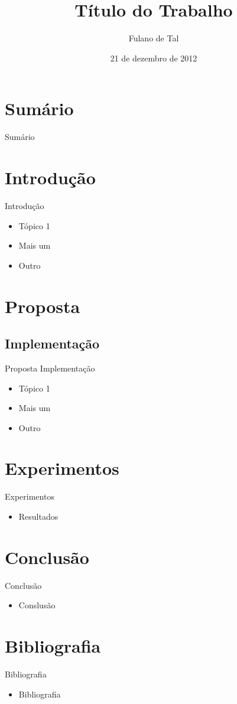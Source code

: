 \documentclass{beamer}
\title{Título do Trabalho}
\author{Fulano de Tal}
\institute{Universidade do Vale do Rio dos Sinos - UNISINOS}
\date{21 de dezembro de 2012}
\begin{document}
\begin{frame}
\titlepage
\end{frame}

\section{Sumário}
\begin{frame}{Sumário}
    \tableofcontents[]
\end{frame}

\section{Introdução}
\begin{frame}{Introdução} 
\begin{itemize}
\pause \item Tópico 1
\pause \item Mais um
\pause \item Outro
\end{itemize}
\end{frame}

\section{Proposta}
\subsection{Implementação}
\begin{frame}{Proposta} {Implementação}
\begin{itemize}
\pause \item Tópico 1
\pause \item Mais um
\pause \item Outro
\end{itemize}
\end{frame}

\section{Experimentos}
\begin{frame}{Experimentos}
\begin{itemize}
\pause \item Resultados
\end{itemize}
\end{frame}

\section{Conclusão}
\begin{frame}{Conclusão}
\begin{itemize}
\pause \item Conslusão
\end{itemize}
\end{frame}

\section{Bibliografia}
\begin{frame}{Bibliografia}
\begin{itemize}
\pause \item Bibliografia
\end{itemize}
\end{frame}
\end{document}

